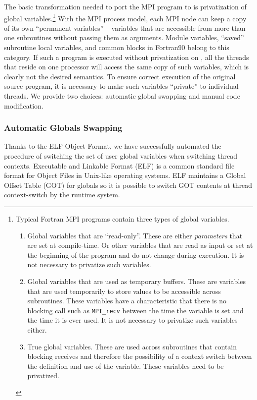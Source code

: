 \documentclass[10pt]{article}
\begin{document}
The basic transformation needed to port the MPI program to \ampi{} is
privatization of global variables.\footnote{Typical Fortran MPI programs
contain three types of global variables.

\begin{enumerate}

\item Global variables that are ``read-only''. These are either
\emph{parameters} that are set at compile-time. Or other variables that are
read as input or set at the beginning of the program and do not change during
execution. It is not necessary to privatize such variables.

\item Global variables that are used as temporary buffers. These are variables
that are used temporarily to store values to be accessible across subroutines.
These variables have a characteristic that there is no blocking call such as
\texttt{MPI\_recv} between the time the variable is set and the time it is ever
used. It is not necessary to privatize such variables either. 

\item True global variables. These are used across subroutines that contain
blocking receives and therefore the possibility of a context switch between the
definition and use of the variable. These variables need to be privatized.

\end{enumerate}
}
With the MPI process model, each MPI node can keep a copy of its own
``permanent variables'' -- variables that are accessible from more than one
subroutines without passing them as arguments.  Module variables, ``saved''
subroutine local variables, and common blocks in Fortran90 belong to this
category. If such a program is executed without privatization on \ampi{}, all
the \ampi{} threads that reside on one processor will access the same copy of
such variables, which is clearly not the desired semantics.  To ensure correct
execution of the original source program, it is necessary to make such
variables ``private'' to individual threads. We provide two choices: automatic 
global swapping and manual code modification.

\subsubsection{Automatic Globals Swapping}
Thanks to the ELF Object Format, we have successfully automated the procedure 
of switching the set of user global variables when switching thread contexts.
Executable and Linkable Format (ELF) is a common standard file format 
for Object Files in Unix-like operating systems.
ELF maintains a Global Offset Table (GOT) for globals so it is possible to
switch GOT contents at thread context-switch by the runtime system.
\end{document}
